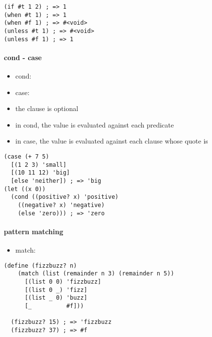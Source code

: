 \documentclass[a4paper,landscape,10pt]{article}
\begin{document}
\begin{multicols*}{2}
  \begin{lstlisting}[language=Racket]
(if #t 1 2) ; => 1
(when #t 1) ; => 1
(when #f 1) ; => #<void>
(unless #t 1) ; => #<void>
(unless #f 1) ; => 1
  \end{lstlisting}

  \paragraph{cond - case}

  \begin{itemize}
    \item cond: 
    \item case: 
    \item the  clause is optional
    \item in cond, the value is evaluated against each predicate
    \item in case, the value is evaluated against each clause whose quote is 
  \end{itemize}

  \begin{lstlisting}[language=Racket]
(case (+ 7 5)
  [(1 2 3) 'small]
  [(10 11 12) 'big]
  [else 'neither]) ; => 'big
(let ((x 0))
  (cond ((positive? x) 'positive)
    ((negative? x) 'negative)
    (else 'zero))) ; => 'zero
  \end{lstlisting}

  \paragraph{pattern matching}

  \begin{itemize}
    \item match: 
  \end{itemize}

  \begin{lstlisting}[language=Racket]
    (define (fizzbuzz? n)
    (match (list (remainder n 3) (remainder n 5))
      [(list 0 0) 'fizzbuzz]
      [(list 0 _) 'fizz]
      [(list _ 0) 'buzz]
      [_          #f]))

  (fizzbuzz? 15) ; => 'fizzbuzz
  (fizzbuzz? 37) ; => #f
  \end{lstlisting}

  \breakcolumn


\end{multicols*}
\end{document}
